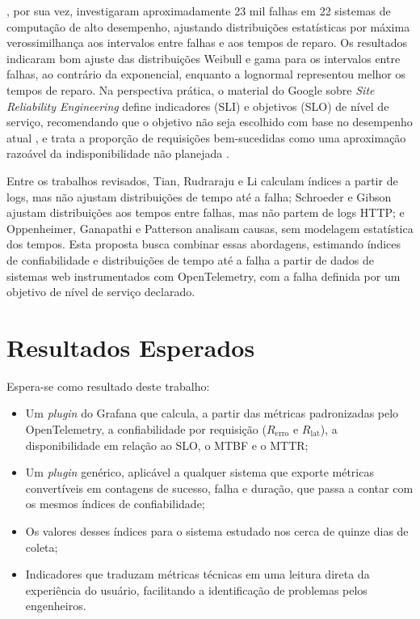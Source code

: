\documentclass[10pt, twocolumn, a4paper]{article}
\begin{document}
, por sua vez, investigaram aproximadamente 23 mil falhas em 22 sistemas de computação de alto desempenho, ajustando distribuições estatísticas por máxima verossimilhança aos intervalos entre falhas e aos tempos de reparo. Os resultados indicaram bom ajuste das distribuições Weibull e gama para os intervalos entre falhas, ao contrário da exponencial, enquanto a lognormal representou melhor os tempos de reparo. Na perspectiva prática, o material do Google sobre \textit{Site Reliability Engineering} define indicadores (SLI) e objetivos (SLO) de nível de serviço, recomendando que o objetivo não seja escolhido com base no desempenho atual \cite{jones2016slo}, e trata a proporção de requisições bem-sucedidas como uma aproximação razoável da indisponibilidade não planejada \cite{alvidrez2016risk}.

Entre os trabalhos revisados, Tian, Rudraraju e Li calculam índices a partir de logs, mas não ajustam distribuições de tempo até a falha; Schroeder e Gibson ajustam distribuições aos tempos entre falhas, mas não partem de logs HTTP; e Oppenheimer, Ganapathi e Patterson analisam causas, sem modelagem estatística dos tempos. Esta proposta busca combinar essas abordagens, estimando índices de confiabilidade e distribuições de tempo até a falha a partir de dados de sistemas web instrumentados com OpenTelemetry, com a falha definida por um objetivo de nível de serviço declarado.



\section{Resultados Esperados}

Espera-se como resultado deste trabalho:

\begin{itemize}
  \item Um \textit{plugin} do Grafana que calcula, a partir das métricas padronizadas pelo OpenTelemetry, a confiabilidade por requisição ($R_{\mathrm{erro}}$ e $R_{\mathrm{lat}}$), a disponibilidade em relação ao SLO, o MTBF e o MTTR;
  \item Um \textit{plugin} genérico, aplicável a qualquer sistema que exporte métricas convertíveis em contagens de sucesso, falha e duração, que passa a contar com os mesmos índices de confiabilidade;
  \item Os valores desses índices para o sistema estudado nos cerca de quinze dias de coleta;
  \item Indicadores que traduzam métricas técnicas em uma leitura direta da experiência do usuário, facilitando a identificação de problemas pelos engenheiros.
\end{itemize}
\end{document}
